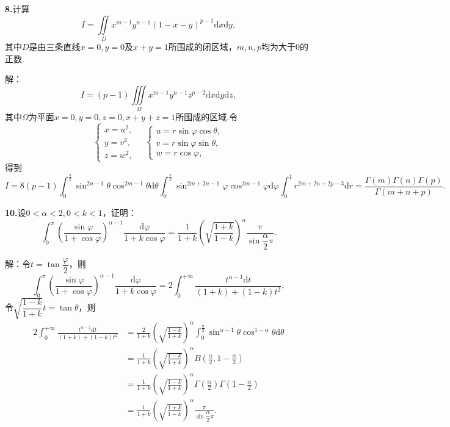 \documentclass[12pt, a4paper]{article}
\newcommand{\dif}{\mathrm{d}}
\begin{document}
\textbf{8.}计算
\[I = \iint\limits_D x^{m - 1}y^{n - 1}(1 - x - y)^{p - 1}\dif x\dif y,\]
其中\(D\)是由三条直线\(x = 0, y = 0\)及\(x + y = 1\)所围成的闭区域，\(m, n, p\)均为大于0的正数.

解：
\[I = (p - 1)\iiint\limits_\Omega x^{m - 1}y^{n - 1}z^{p - 2}\dif x\dif y\dif z,\]
其中\(\Omega\)为平面\(x = 0, y = 0, z = 0, x + y + z = 1\)所围成的区域.令
\[\begin{cases}
x = u^2, \\
y = v^2, \\
z = w^2,
\end{cases} \quad \begin{cases}
u = r\sin\varphi\cos\theta, \\
v = r\sin\varphi\sin\theta, \\
w = r\cos\varphi,
\end{cases}\]
得到
\[I = 8(p - 1)\int_{0}^{\frac{\pi}{2}} \sin^{2n - 1}\theta\cos^{2m - 1}\theta\dif\theta \int_{0}^{\frac{\pi}{2}}\sin^{2m + 2n - 1}\varphi\cos^{2m - 1}\varphi\dif\varphi \int_0^1 r^{2m + 2n + 2p - 3}\dif r = \frac{\Gamma(m)\Gamma(n)\Gamma(p)}{\Gamma(m + n + p)}.\]

\textbf{10.}设\(0 < \alpha < 2, 0 < k < 1\)，证明：
\[\int_0^\pi \left(\frac{\sin\varphi}{1 + \cos\varphi}\right)^{\alpha - 1}\frac{\dif\varphi}{1 + k\cos\varphi} = \frac{1}{1 + k}\left(\sqrt{\frac{1 + k}{1 - k}}\right)^\alpha\frac{\pi}{\sin\dfrac{\alpha}{2}\pi}.\]

解：令\(t = \tan\dfrac{\varphi}{2}\)，则
\[\int_0^\pi \left(\frac{\sin\varphi}{1 + \cos\varphi}\right)^{\alpha - 1}\frac{\dif\varphi}{1 + k\cos\varphi} = 2\int_{0}^{+\infty} \frac{t^{\alpha - 1}\dif t}{(1 + k) + (1 - k)t^2},\]
令\(\sqrt{\dfrac{1 - k}{1 + k}}t = \tan\theta\)，则
\begin{align*}
2\int_{0}^{+\infty} \frac{t^{\alpha - 1}\dif t}{(1 + k) + (1 - k)t^2} &= \frac{2}{1 + k}\left(\sqrt{\frac{1 - k}{1 + k}}\right)^\alpha \int_{0}^{\frac{\pi}{2}} \sin^{\alpha - 1}\theta\cos^{1 - \alpha}\theta\dif\theta \\
&= \frac{1}{1 + k}\left(\sqrt{\frac{1 - k}{1 + k}}\right)^\alpha B\left(\frac{\alpha}{2}, 1 - \frac{\alpha}{2}\right) \\
&= \frac{1}{1 + k}\left(\sqrt{\frac{1 - k}{1 + k}}\right)^\alpha \Gamma\left(\frac{\alpha}{2}\right)\Gamma\left(1 - \frac{\alpha}{2}\right) \\
&= \frac{1}{1 + k}\left(\sqrt{\frac{1 + k}{1 - k}}\right)^\alpha\frac{\pi}{\sin\dfrac{\alpha}{2}\pi}.
\end{align*}
\end{document}
